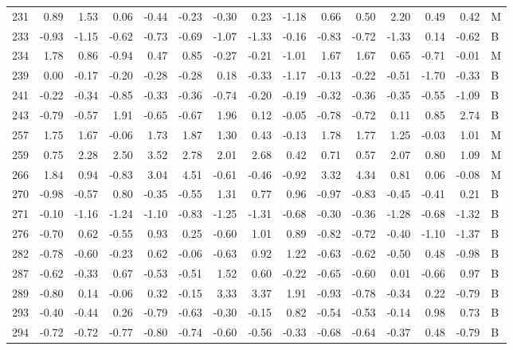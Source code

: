 \begin{table}[ht]
\begin{tabular}{rrrrrrrrrrrrrrl}
  231 & 0.89 & 1.53 & 0.06 & -0.44 & -0.23 & -0.30 & 0.23 & -1.18 & 0.66 & 0.50 & 2.20 & 0.49 & 0.42 & M \\ 
  233 & -0.93 & -1.15 & -0.62 & -0.73 & -0.69 & -1.07 & -1.33 & -0.16 & -0.83 & -0.72 & -1.33 & 0.14 & -0.62 & B \\ 
  234 & 1.78 & 0.86 & -0.94 & 0.47 & 0.85 & -0.27 & -0.21 & -1.01 & 1.67 & 1.67 & 0.65 & -0.71 & -0.01 & M \\ 
  239 & 0.00 & -0.17 & -0.20 & -0.28 & -0.28 & 0.18 & -0.33 & -1.17 & -0.13 & -0.22 & -0.51 & -1.70 & -0.33 & B \\ 
  241 & -0.22 & -0.34 & -0.85 & -0.33 & -0.36 & -0.74 & -0.20 & -0.19 & -0.32 & -0.36 & -0.35 & -0.55 & -1.09 & B \\ 
  243 & -0.79 & -0.57 & 1.91 & -0.65 & -0.67 & 1.96 & 0.12 & -0.05 & -0.78 & -0.72 & 0.11 & 0.85 & 2.74 & B \\ 
  257 & 1.75 & 1.67 & -0.06 & 1.73 & 1.87 & 1.30 & 0.43 & -0.13 & 1.78 & 1.77 & 1.25 & -0.03 & 1.01 & M \\ 
  259 & 0.75 & 2.28 & 2.50 & 3.52 & 2.78 & 2.01 & 2.68 & 0.42 & 0.71 & 0.57 & 2.07 & 0.80 & 1.09 & M \\ 
  266 & 1.84 & 0.94 & -0.83 & 3.04 & 4.51 & -0.61 & -0.46 & -0.92 & 3.32 & 4.34 & 0.81 & 0.06 & -0.08 & M \\ 
  270 & -0.98 & -0.57 & 0.80 & -0.35 & -0.55 & 1.31 & 0.77 & 0.96 & -0.97 & -0.83 & -0.45 & -0.41 & 0.21 & B \\ 
  271 & -0.10 & -1.16 & -1.24 & -1.10 & -0.83 & -1.25 & -1.31 & -0.68 & -0.30 & -0.36 & -1.28 & -0.68 & -1.32 & B \\ 
  276 & -0.70 & 0.62 & -0.55 & 0.93 & 0.25 & -0.60 & 1.01 & 0.89 & -0.82 & -0.72 & -0.40 & -1.10 & -1.37 & B \\ 
  282 & -0.78 & -0.60 & -0.23 & 0.62 & -0.06 & -0.63 & 0.92 & 1.22 & -0.63 & -0.62 & -0.50 & 0.48 & -0.98 & B \\ 
  287 & -0.62 & -0.33 & 0.67 & -0.53 & -0.51 & 1.52 & 0.60 & -0.22 & -0.65 & -0.60 & 0.01 & -0.66 & 0.97 & B \\ 
  289 & -0.80 & 0.14 & -0.06 & 0.32 & -0.15 & 3.33 & 3.37 & 1.91 & -0.93 & -0.78 & -0.34 & 0.22 & -0.79 & B \\ 
  293 & -0.40 & -0.44 & 0.26 & -0.79 & -0.63 & -0.30 & -0.15 & 0.82 & -0.54 & -0.53 & -0.14 & 0.98 & 0.73 & B \\ 
  294 & -0.72 & -0.72 & -0.77 & -0.80 & -0.74 & -0.60 & -0.56 & -0.33 & -0.68 & -0.64 & -0.37 & 0.48 & -0.79 & B \\ 

\end{tabular}
\end{table}
